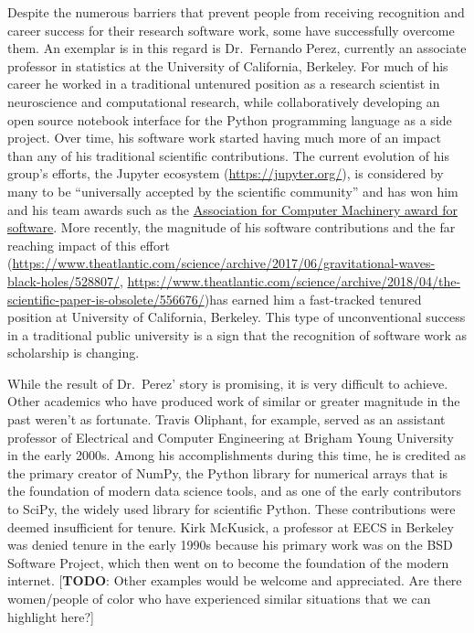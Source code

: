 \documentclass[
]{book}
\begin{document}
Despite the numerous barriers that prevent people from receiving recognition and career success for their research software work, some have successfully overcome them. An exemplar is in this regard is Dr.~Fernando Perez, currently an associate professor in statistics at the University of California, Berkeley. For much of his career he worked in a traditional untenured position as a research scientist in neuroscience and computational research, while collaboratively developing an open source notebook interface for the Python programming language as a side project. Over time, his software work started having much more of an impact than any of his traditional scientific contributions. The current evolution of his group's efforts, the Jupyter ecosystem (\url{https://jupyter.org/}), is considered by many to be ``universally accepted by the scientific community'' and has won him and his team awards such as the \href{https://blog.jupyter.org/jupyter-receives-the-acm-software-system-award-d433b0dfe3a2}{Association for Computer Machinery award for software}.
More recently, the magnitude of his software contributions and the far reaching impact of
this effort (\url{https://www.theatlantic.com/science/archive/2017/06/gravitational-waves-black-holes/528807/},
\url{https://www.theatlantic.com/science/archive/2018/04/the-scientific-paper-is-obsolete/556676/})has earned him a fast-tracked tenured position at University of California, Berkeley. This type of unconventional success in a traditional public university is a sign that the recognition of software work as scholarship is changing.

While the result of Dr.~Perez' story is promising, it is very difficult to achieve. Other academics who have produced work of similar or greater magnitude in the past weren't as fortunate. Travis Oliphant, for example, served as an assistant professor of Electrical and Computer Engineering at Brigham Young University in the early 2000s. Among his accomplishments during this time, he is credited as the primary creator of NumPy, the Python library for numerical arrays that is the foundation of modern data science tools, and as one of the early contributors to SciPy, the widely used library for scientific Python. These contributions were deemed insufficient for tenure. Kirk McKusick, a professor at EECS in Berkeley was denied tenure in the early 1990s because his primary work was on the BSD Software Project, which then went on to become the foundation of the modern internet. {[}\textbf{TODO}: Other examples would be welcome and appreciated. Are there women/people of color who have experienced similar situations that we can highlight here?{]}
\end{document}
